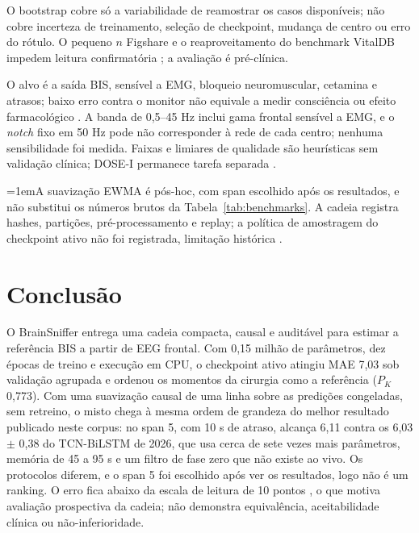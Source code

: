 \documentclass[12pt]{article}
\begin{document}
O bootstrap cobre só a variabilidade de reamostrar os casos disponíveis; não cobre incerteza de treinamento, seleção de checkpoint, mudança de centro ou erro do rótulo. O pequeno $n$ Figshare e o reaproveitamento do benchmark VitalDB impedem leitura confirmatória \cite{field2007,archer2021}; a avaliação é pré-clínica.

O alvo é a saída BIS, sensível a EMG, bloqueio neuromuscular, cetamina e atrasos; baixo erro contra o monitor não equivale a medir consciência ou efeito farmacológico \cite{schuller2015,hans2005,pilge2006}. A banda de 0,5--45 Hz inclui gama frontal sensível a EMG, e o \textit{notch} fixo em 50 Hz pode não corresponder à rede de cada centro; nenhuma sensibilidade foi medida. Faixas e limiares de qualidade são heurísticas sem validação clínica; DOSE-I permanece tarefa separada \cite{dosei}.

\begingroup\emergencystretch=1em\relax A suavização EWMA é pós-hoc, com span escolhido após os resultados, e não substitui os números brutos da Tabela~\ref{tab:benchmarks}. A cadeia registra hashes, partições, pré-processamento e replay; a política de amostragem do checkpoint ativo não foi registrada, limitação histórica \cite{tripodai}.
\par\endgroup

\section{Conclusão}

O BrainSniffer entrega uma cadeia compacta, causal e auditável para estimar a referência BIS a partir de EEG frontal. Com 0,15 milhão de parâmetros, dez épocas de treino e execução em CPU, o checkpoint ativo atingiu MAE 7,03 sob validação agrupada e ordenou os momentos da cirurgia como a referência ($P_K$ 0,773). Com uma suavização causal de uma linha sobre as predições congeladas, sem retreino, o misto chega à mesma ordem de grandeza do melhor resultado publicado neste corpus: no span 5, com 10 s de atraso, alcança 6,11 contra os 6,03 $\pm$ 0,38 do TCN-BiLSTM de 2026, que usa cerca de sete vezes mais parâmetros, memória de 45 a 95 s e um filtro de fase zero que não existe ao vivo. Os protocolos diferem, e o span 5 foi escolhido após ver os resultados, logo não é um ranking. O erro fica abaixo da escala de leitura de 10 pontos \cite{harada2021}, o que motiva avaliação prospectiva da cadeia; não demonstra equivalência, aceitabilidade clínica ou não-inferioridade.
\end{document}
